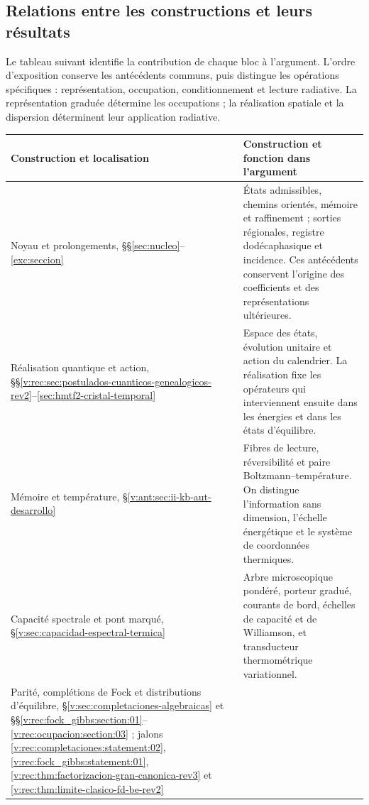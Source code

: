 \clearpage
\subsection*{Relations entre les constructions et leurs résultats}
Le tableau suivant identifie la contribution de chaque bloc à l’argument.
L’ordre d’exposition conserve les antécédents communs, puis distingue
les opérations spécifiques : représentation, occupation, conditionnement et
lecture radiative. La représentation graduée détermine les occupations ; la réalisation
spatiale et la dispersion déterminent leur application radiative.

\begin{table}[H]
\centering
\small
\renewcommand{\arraystretch}{1.2}
\begin{tabularx}{\textwidth}{@{}>{\raggedright\arraybackslash}p{}>{\raggedright\arraybackslash}X@{}}
\toprule
Construction et localisation & Construction et fonction dans l’argument \\
\midrule
Noyau et prolongements, §§\ref{sec:nucleo}--\ref{exc:seccion}
& États admissibles, chemins orientés, mémoire et raffinement ; sorties
régionales, registre dodécaphasique et incidence. Ces antécédents conservent
l’origine des coefficients et des représentations ultérieures. \\
Réalisation quantique et action,
§§\ref{v:rec:sec:postulados-cuanticos-genealogicos-rev2}--\ref{sec:hmtf2-cristal-temporal}
& Espace des états, évolution unitaire et action du calendrier. La
réalisation fixe les opérateurs qui interviennent ensuite dans les énergies
et dans les états d’équilibre. \\
Mémoire et température,
§\ref{v:ant:sec:ii-kb-aut-desarrollo}
& Fibres de lecture, réversibilité et paire Boltzmann--température.
On distingue l’information sans dimension, l’échelle énergétique et le système de coordonnées thermiques. \\
Capacité spectrale et pont marqué,
§\ref{v:sec:capacidad-espectral-termica}
& Arbre microscopique pondéré, porteur gradué, courants de bord,
échelles de capacité et de Williamson, et transducteur thermométrique variationnel. \\
Parité, complétions de Fock et distributions d’équilibre,
§\ref{v:sec:completaciones-algebraicas} et
§§\ref{v:rec:fock_gibbs:section:01}--\ref{v:rec:ocupacion:section:03} ;
jalons \ref{v:rec:completaciones:statement:02},
\ref{v:rec:fock_gibbs:statement:01},
\ref{v:rec:thm:factorizacion-gran-canonica-rev3} et
\ref{v:rec:thm:limite-clasico-fd-be-rev2}

\end{tabularx}
\end{table}
